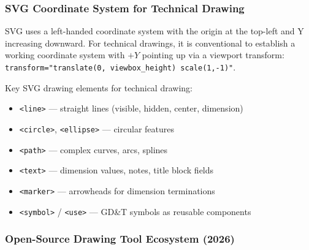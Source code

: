 \documentclass[11pt,letterpaper]{article}
\begin{document}
\subsubsection{SVG Coordinate System for Technical Drawing}

SVG uses a left-handed coordinate system with the origin at the top-left and Y increasing downward. For technical drawings, it is conventional to establish a working coordinate system with $+Y$ pointing up via a viewport transform: \texttt{transform="translate(0, viewbox\_height) scale(1,-1)"}.

Key SVG drawing elements for technical drawing:
\begin{itemize}[noitemsep]
  \item \texttt{<line>} --- straight lines (visible, hidden, center, dimension)
  \item \texttt{<circle>}, \texttt{<ellipse>} --- circular features
  \item \texttt{<path>} --- complex curves, arcs, splines
  \item \texttt{<text>} --- dimension values, notes, title block fields
  \item \texttt{<marker>} --- arrowheads for dimension terminations
  \item \texttt{<symbol>} / \texttt{<use>} --- GD\&T symbols as reusable components
\end{itemize}

\subsubsection{Open-Source Drawing Tool Ecosystem (2026)}
\end{document}
